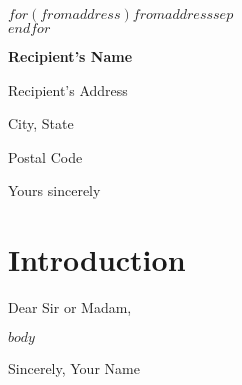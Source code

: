 \documentclass[a4paper, 10pt]{article}
\begin{document}
\hfill
\begin{minipage}[t]{.2\textwidth}
    $for(fromaddress)$$fromaddress$$sep$\\$endfor$
\end{minipage}

\begin{minipage}{0.4\linewidth}
\textbf{Recipient's Name} \par
Recipient's Address \par
City, State \par
Postal Code
\end{minipage}

\null\hfill Yours sincerely

\section{Introduction}
Dear Sir or Madam,

$body$

Sincerely,
Your Name
\end{document}
